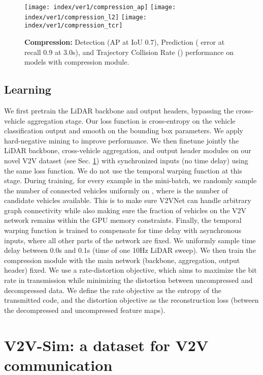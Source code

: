 \documentclass[runningheads]{llncs}
\begin{document}
\begin{figure}[t]
  \centering
\texttt{[image: index/ver1/compression\_ap]}
  \hspace{0.01\linewidth}
  \texttt{[image: index/ver1/compression\_l2]}
  \hspace{0.01\linewidth}
  \texttt{[image: index/ver1/compression\_tcr]}
  
  \caption{{\bf Compression:} Detection (AP at IoU 0.7), Prediction ( error at recall 0.9 at 3.0s), and Trajectory Collision Rate () performance on models with compression module. }
\label{fig:compression}
\end{figure}

\subsection{Learning}
\label{sec:learning}
We first pretrain the LiDAR backbone and output headers,
 bypassing the cross-vehicle aggregation stage.
Our loss function is cross-entropy on the vehicle classification output and smooth  on the bounding box parameters.
We apply hard-negative mining  to improve performance.
We then  finetune jointly the LiDAR backbone, cross-vehicle aggregation, and output header modules on our novel V2V dataset (see Sec. \ref{sec:dataset}) with synchronized inputs (no time delay) using the same loss function.
We do not use the temporal warping function at this stage.
During training, for every example in the mini-batch, we randomly sample the number of connected vehicles uniformly on , where  is the number of candidate vehicles available.
This is to make sure V2VNet can handle arbitrary graph connectivity while also making sure the fraction of vehicles 
on the V2V network remains within the GPU memory constraints.
Finally, the temporal warping function is trained to compensate for time delay with asynchronous inputs, where all other parts of the network are fixed.
We uniformly sample time delay between 0.0s and 0.1s (time of one 10Hz LiDAR sweep).
We then train the compression module with the main network (backbone, aggregation, output header) fixed. We use a rate-distortion objective, which aims to maximize the bit rate in transmission while minimizing the distortion between uncompressed and decompressed data.
We define the rate objective as the entropy of the transmitted code, and the distortion objective  as the reconstruction loss (between the decompressed and uncompressed feature maps).

\section{V2V-Sim: a dataset for V2V communication}
\label{sec:dataset}
\end{document}
